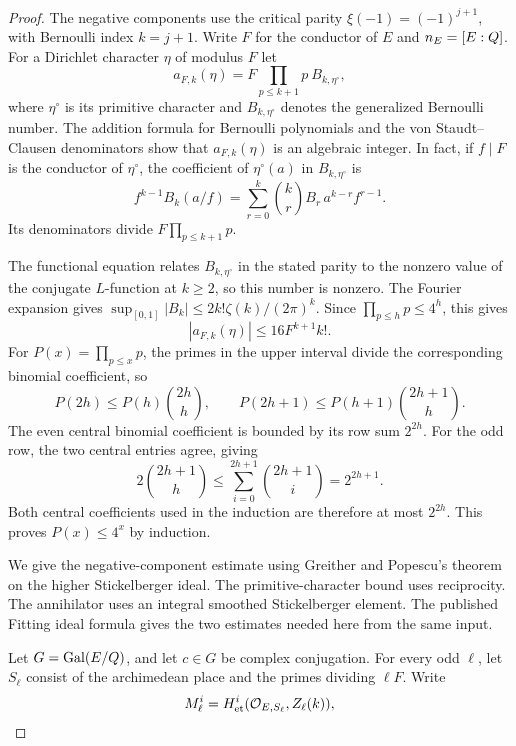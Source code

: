 \begin{proof}

The negative components use the critical parity
\(\xi(-1)=(-1)^{j+1}\), with Bernoulli index \(k=j+1\).
Write \(F\) for the conductor of \(E\) and \(n_E=[E:Q]\).
For a Dirichlet character \(\eta\) of modulus \(F\) let
\[
    a_{F,k}(\eta)=F\!\prod_{p\le k+1}p\ B_{k,\eta^\circ},
\]
where \(\eta^\circ\) is its primitive character and
\(B_{k,\eta^\circ}\) denotes the generalized Bernoulli number.
The addition formula for Bernoulli polynomials and the
von Staudt--Clausen denominators show that \(a_{F,k}(\eta)\)
is an algebraic integer. In fact, if \(f\mid F\) is the
conductor of \(\eta^\circ\), the coefficient of \(\eta^\circ(a)\)
in \(B_{k,\eta^\circ}\) is
\[
   f^{k-1}B_k(a/f)=\sum_{r=0}^k\binom{k}{r}
                      B_r\,a^{k-r}f^{r-1}.
\]
Its denominators divide \(F\prod_{p\le k+1}p\).

The functional equation relates \(B_{k,\eta^\circ}\) in the
stated parity to the nonzero value of the conjugate
\(L\)-function at \(k\ge2\), so this number is nonzero.
The Fourier expansion gives
\(\sup_{[0,1]}|B_k|\le2k!\zeta(k)/(2\pi)^k\).
Since \(\prod_{p\le h}p\le4^h\), this gives
\[
       |a_{F,k}(\eta)|\le16 F^{k+1}k! .
 \tag{B}\label{eq:local-odd-b}
\]
For \(P(x)=\prod_{p\le x}p\), the primes in the upper interval
divide the corresponding binomial coefficient, so
\[
      P(2h)\le P(h)\binom{2h}{h},\qquad
      P(2h+1)\le P(h+1)\binom{2h+1}{h}.
\]
The even central binomial coefficient is bounded by its row sum \(2^{2h}\). For the odd row, the two central entries agree, giving
\[
 2\binom{2h+1}{h}\le\sum_{i=0}^{2h+1}\binom{2h+1}{i}=2^{2h+1}.
\]
Both central coefficients used in the induction are therefore at most \(2^{2h}\). This
proves \(P(x)\le4^x\) by induction.

We give the negative-component estimate using Greither and
Popescu's theorem on the higher Stickelberger ideal. The primitive-character bound uses reciprocity. The annihilator uses an integral smoothed Stickelberger element. The published Fitting ideal
formula gives the two estimates needed here from the same input.
\hfill\mbox{\cite{greither-popescu}}\label{cor:ordinary-odd-primes-12}


Let \(G=\operatorname{Gal}(E/Q)\), and let \(c\in G\) be complex
conjugation. For every odd \(\ell\), let \(S_\ell\) consist of the
archimedean place and the primes dividing \(\ell F\).
Write
\[
 M_\ell^i=H^i_{\rm et}(\mathcal O_{E,S_\ell},Z_\ell(k)),
\]


\end{proof}
